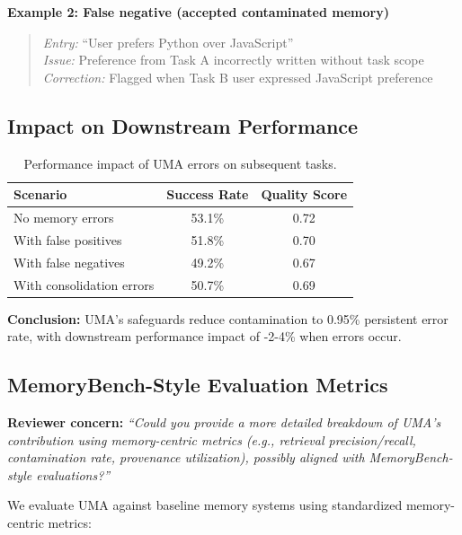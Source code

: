 \documentclass{article}
\theoremstyle{plain}
\theoremstyle{definition}
\theoremstyle{remark}
\begin{document}
\textbf{Example 2: False negative (accepted contaminated memory)}
\begin{quote}
\small
\textit{Entry:} ``User prefers Python over JavaScript'' \\
\textit{Issue:} Preference from Task A incorrectly written without task scope \\
\textit{Correction:} Flagged when Task B user expressed JavaScript preference
\end{quote}

\subsection{Impact on Downstream Performance}

\begin{table}[h]
\centering
\caption{Performance impact of UMA errors on subsequent tasks.}
\label{tab:uma-impact}
\small
\begin{tabular}{lcc}
\toprule
\textbf{Scenario} & \textbf{Success Rate} & \textbf{Quality Score} \\
\midrule
No memory errors & 53.1\% & 0.72 \\
With false positives & 51.8\% & 0.70 \\
With false negatives & 49.2\% & 0.67 \\
With consolidation errors & 50.7\% & 0.69 \\
\bottomrule
\end{tabular}
\end{table}

\textbf{Conclusion:} UMA's safeguards reduce contamination to 0.95\% persistent error rate, with downstream performance impact of -2-4\% when errors occur.

\subsection{MemoryBench-Style Evaluation Metrics}

\textbf{Reviewer concern:} \textit{``Could you provide a more detailed breakdown of UMA's contribution using memory-centric metrics (e.g., retrieval precision/recall, contamination rate, provenance utilization), possibly aligned with MemoryBench-style evaluations?''}

We evaluate UMA against baseline memory systems using standardized memory-centric metrics:
\end{document}
